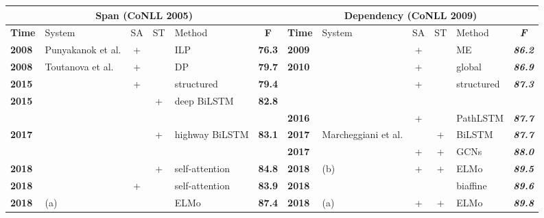 \documentclass[letterpaper]{article} \usepackage{aaai19}  \usepackage{times}  \usepackage{helvet}  \usepackage{courier}  \usepackage{url}  \usepackage{graphicx}  \frenchspacing  \setlength{\pdfpagewidth}{8.5in}  \setlength{\pdfpageheight}{11in}
\begin{document}
\begin{table*}[!htp]
	\renewcommand\arraystretch{1.3}
	\setlength{\tabcolsep}{5pt}
	\centering
	\small 
\begin{tabular}{llcclc|llcclc}
		\hline
		
		\hline
		\multicolumn{6}{c|}{\textbf{Span (CoNLL 2005)}} & \multicolumn{6}{c}{\textbf{Dependency (CoNLL 2009)}} \\ 
		\hline
		\textbf{Time} & System  & SA & ST & Method & \textbf{F} & \textbf{Time} & System & SA & ST & Method & \textit{\textbf{F}} \\ 
		\hline
		\textbf{2008} & Punyakanok et al. & + & & ILP & \textbf{76.3} & \textbf{2009} & \citeauthor{Zhao2009Conll} & + &  & ME & \textit{\textbf{86.2}} \\ 
		\hline
		\textbf{2008} & Toutanova et al. & + &  & DP & \textbf{79.7} & \textbf{2010} & \citeauthor{bjorkelund2010} & + &  & global & \textit{\textbf{86.9}} \\ 
		\hline
		
		\hline
		\multicolumn{1}{l}{\textbf{2015}} & \multicolumn{1}{l}{\textbf{\citeauthor{Fitzgerald2015}}} &
		\multicolumn{1}{c}{+} & \multicolumn{1}{c}{} & \multicolumn{1}{l}{structured} & \multicolumn{1}{c}{\textbf{79.4}} & \multicolumn{2}{l}{} & \multicolumn{1}{c}{+} & \multicolumn{1}{c}{} & \multicolumn{1}{l}{structured} & \multicolumn{1}{c}{\textit{\textbf{87.3}}}\\
		\hline
		
		\hline
		\textbf{2015} & \citeauthor{zhou-xu2015} &  & +  & deep BiLSTM & \textbf{82.8} &  &  &  &  &  & \\
		\hline
		&  &  &  &  &  & \textbf{2016} & \citeauthor{roth2016} & +  &  & PathLSTM & \textit{\textbf{87.7}} \\ 
		\hline
		\textbf{2017} & \citeauthor{he-acl2017} &  & + & highway BiLSTM & \textbf{83.1} & \textbf{2017} & Marcheggiani et al. &  & +  & BiLSTM  & \textit{\textbf{87.7}} \\ 
		\hline
		&  &  &  &  &  & \textbf{2017} & \citeauthor{marcheggianiEMNLP2017} & +  & +  & GCNs  & \textit{\textbf{88.0}} \\
		\hline
		\textbf{2018} & \citeauthor{selfatt2018} &  & +  & self-attention & \textbf{84.8} & \textbf{2018} & \citeauthor{he:2018Syntax} (b) & + & +  & ELMo  & \textit{\textbf{89.5}} \\ 
		\hline
		\textbf{2018} & \citeauthor{Strubell2018}  & +  &  & self-attention & \textbf{83.9} & \textbf{2018} & \citeauthor{cai2018full} &  &  & biaffine  & \textit{\textbf{89.6}} \\ 
		\hline
		\textbf{2018} & \citeauthor{he2018jointly} (a) &  &  & ELMo  & \textbf{87.4} & \textbf{2018} & \citeauthor{li2018unified} (a) & + & + & ELMo & \textit{\textbf{89.8}} \\ 
		\hline
		

\end{tabular}
\end{table*}
\end{document}
